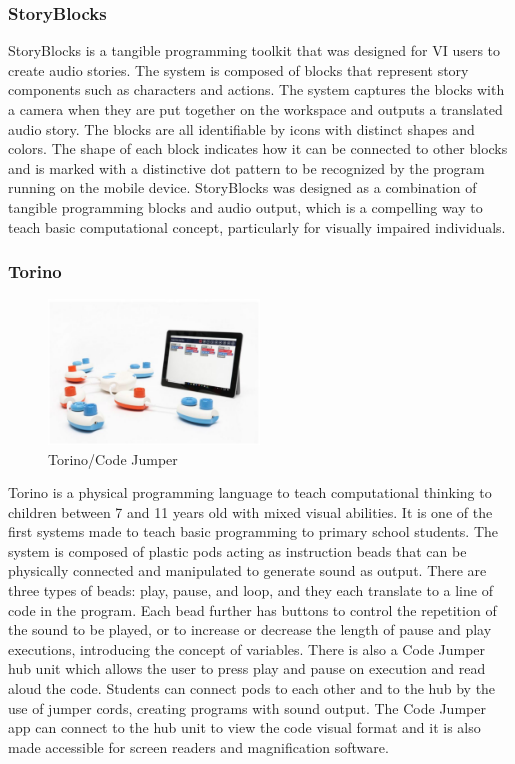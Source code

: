 \documentclass[oneside,%
                    author={Malak Hajji},
                    degree={BSc},
                    title={Designing An Accessible Ozobot Programming Platform for Students},
                  subtitle={With Mixed Visual Abilities}]{dissertation}
\begin{document}
\subsubsection{StoryBlocks}
StoryBlocks\cite{storyblocks} is a tangible programming toolkit that was designed for VI users to create audio stories. The system is composed of blocks that represent story components such as characters and actions. The system captures the blocks with a camera when they are put together on the workspace and outputs a translated audio story. The blocks are all identifiable by icons with distinct shapes and colors. The shape of each block indicates how it can be connected to other blocks and is marked with a distinctive dot pattern to be recognized by the program running on the mobile device. StoryBlocks was designed as a combination of tangible programming blocks and audio output, which is a compelling way to teach basic computational concept, particularly for visually impaired individuals.

\subsubsection{Torino}
\begin{figure}
    \centering
    \includegraphics[width=0.5\textwidth]{thesis/torino.eps}
    \caption{Torino/Code Jumper\cite{torino}}
    \label{fig-torino}
\end{figure}
Torino\cite{torino} is a physical programming language to teach computational thinking to children between 7 and 11 years old with mixed visual abilities. It is one of the first systems made to teach basic programming to primary school students. The system is composed of plastic pods acting as instruction beads that can be physically connected and manipulated to generate sound as output. There are three types of beads: play, pause, and loop, and they each translate to a line of code in the program. Each bead further has buttons to control the repetition of the sound to be played, or to increase or decrease the length of pause and play executions, introducing the concept of variables. There is also a Code Jumper hub unit which allows the user to press play and pause on execution and read aloud the code. Students can connect pods to each other and to the hub by the use of jumper cords, creating programs with sound output. The Code Jumper app can connect to the hub unit to view the code visual format and it is also made accessible for screen readers and magnification software.  
\end{document}
